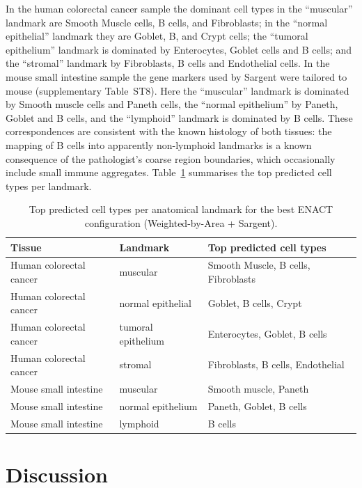 \documentclass[11pt]{article}
\begin{document}
In the human colorectal cancer sample the dominant cell types in the ``muscular'' landmark are Smooth Muscle cells, B cells, and Fibroblasts; in the ``normal epithelial'' landmark they are Goblet, B, and Crypt cells; the ``tumoral epithelium'' landmark is dominated by Enterocytes, Goblet cells and B cells; and the ``stromal'' landmark by Fibroblasts, B cells and Endothelial cells. In the mouse small intestine sample the gene markers used by Sargent were tailored to mouse (supplementary Table~ST8). Here the ``muscular'' landmark is dominated by Smooth muscle cells and Paneth cells, the ``normal epithelium'' by Paneth, Goblet and B cells, and the ``lymphoid'' landmark is dominated by B cells. These correspondences are consistent with the known histology of both tissues: the mapping of B cells into apparently non-lymphoid landmarks is a known consequence of the pathologist's coarse region boundaries, which occasionally include small immune aggregates. Table~\ref{tab:landmarks} summarises the top predicted cell types per landmark.

\begin{table}[htbp]
\centering
\caption{Top predicted cell types per anatomical landmark for the best ENACT configuration (Weighted-by-Area + Sargent).}
\label{tab:landmarks}
\begin{tabular}{llp{6.5cm}}
\toprule
Tissue & Landmark & Top predicted cell types \\
\midrule
Human colorectal cancer & muscular & Smooth Muscle, B cells, Fibroblasts \\
Human colorectal cancer & normal epithelial & Goblet, B cells, Crypt \\
Human colorectal cancer & tumoral epithelium & Enterocytes, Goblet, B cells \\
Human colorectal cancer & stromal & Fibroblasts, B cells, Endothelial \\
Mouse small intestine & muscular & Smooth muscle, Paneth \\
Mouse small intestine & normal epithelium & Paneth, Goblet, B cells \\
Mouse small intestine & lymphoid & B cells \\
\bottomrule
\end{tabular}
\end{table}

\section{Discussion}
\end{document}
